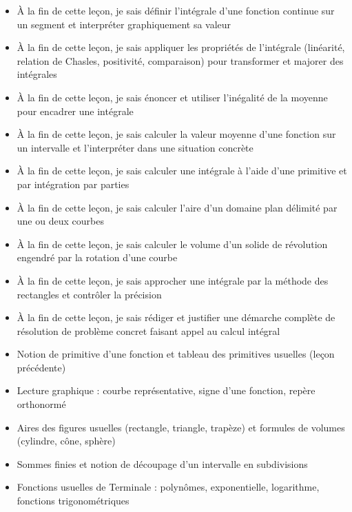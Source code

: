 \documentclass[11pt]{article}
\begin{document}
\begin{objectifs}
\begin{itemize}
\item À la fin de cette leçon, je sais définir l'intégrale d'une fonction continue sur un segment et interpréter graphiquement sa valeur
\item À la fin de cette leçon, je sais appliquer les propriétés de l'intégrale (linéarité, relation de Chasles, positivité, comparaison) pour transformer et majorer des intégrales
\item À la fin de cette leçon, je sais énoncer et utiliser l'inégalité de la moyenne pour encadrer une intégrale
\item À la fin de cette leçon, je sais calculer la valeur moyenne d'une fonction sur un intervalle et l'interpréter dans une situation concrète
\item À la fin de cette leçon, je sais calculer une intégrale à l'aide d'une primitive et par intégration par parties
\item À la fin de cette leçon, je sais calculer l'aire d'un domaine plan délimité par une ou deux courbes
\item À la fin de cette leçon, je sais calculer le volume d'un solide de révolution engendré par la rotation d'une courbe
\item À la fin de cette leçon, je sais approcher une intégrale par la méthode des rectangles et contrôler la précision
\item À la fin de cette leçon, je sais rédiger et justifier une démarche complète de résolution de problème concret faisant appel au calcul intégral
\end{itemize}
\end{objectifs}

\begin{prerequis}
\begin{itemize}
\item Notion de primitive d'une fonction et tableau des primitives usuelles (leçon précédente)
\item Lecture graphique : courbe représentative, signe d'une fonction, repère orthonormé
\item Aires des figures usuelles (rectangle, triangle, trapèze) et formules de volumes (cylindre, cône, sphère)
\item Sommes finies et notion de découpage d'un intervalle en subdivisions
\item Fonctions usuelles de Terminale : polynômes, exponentielle, logarithme, fonctions trigonométriques
\end{itemize}
\end{prerequis}
\end{document}
